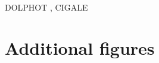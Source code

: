 \documentclass[linenumbers]{aastex63}
\begin{document}
{{DOLPHOT \citep[v2.0][]{dolphin_dolphot_2016}, CIGALE \citep{burgarella_star_2005,noll_analysis_2009,boquien_cigale_2019}}

%
   
 

\clearpage


\section{Additional figures}\label{append:add_fig}
%
%
%

}
\end{document}

